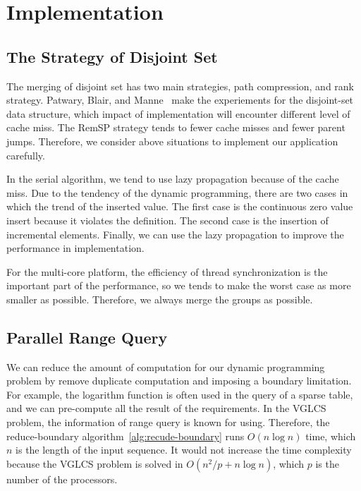 \section{Implementation}
\label{sec:Implementation}

\subsection{The Strategy of Disjoint Set}

The merging of disjoint set has two main strategies, path compression,
and rank strategy.  Patwary, Blair, and
Manne~\cite{Patwary2010ExperimentsOU} make the experiements for the
disjoint-set data structure, which impact of implementation will
encounter different level of cache miss. The {\textrm RemSP} strategy
tends to fewer cache misses and fewer parent jumps.  Therefore, we
consider above situations to implement our application carefully.

\iffalse
運行 VGLCS 時，將耗費 $\theta(n^2)$ 的內存空間。使用遞增後綴最大值 (ISMQ) 時，
採用並查集實作將會遭遇到很多不平衡的工作負載，其原因在於合併的策略，
常見的有路徑壓縮和啟發式合併兩種策略，這間接影響到不同次數的分枝判斷。
實務上須考慮到快取未中
\fi

In the serial algorithm, we tend to use lazy propagation because of the
cache miss.  Due to the tendency of the dynamic programming, there are
two cases in which the trend of the inserted value.  The first case is
the continuous zero value insert because it violates the definition.
The second case is the insertion of incremental elements.  Finally, we
can use the lazy propagation to improve the performance in
implementation.

For the multi-core platform, the efficiency of thread synchronization is
the important part of the performance, so we tends to make the worst
case as more smaller as possible.  Therefore, we always merge the groups
as possible.

\iffalse
每個執行緒負責數個完整的并查集，操作時應偏向延遲標記操作，
儘早合併的策略易造成快取未中。由於動態規劃的傾向中，插入值的趨勢有兩種情況，
其一為連續不合定義的零元素插入，其二為遞增元素的插入，在這兩者穿插的趨勢中，
我們發現延遲操作將會帶來較能改善快取未中問題。
\fi

\subsection{Parallel Range Query}

We can reduce the amount of computation for our dynamic programming
problem by remove duplicate computation and imposing a boundary
limitation.  For example, the logarithm function is often used in the
query of a sparse table, and we can pre-compute all the result of the
requirements.  In the VGLCS problem, the information of range query is
known for using.  Therefore, the reduce-boundary 
algorithm~\ref{alg:recude-boundary} runs $O(n \log n)$ time, which $n$ 
is the length of the input sequence.  It would not increase the time 
complexity because the VGLCS problem is solved in 
$O(n^2 / p + n \log n)$, which $p$ is the number of the processors.


